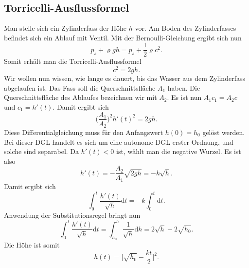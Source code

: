 \documentclass[a4paper,10pt,fleqn,twocolumn,twoside]{scrartcl}
\begin{document}
\subsection{Torricelli-Ausflussformel}
Man stelle sich ein Zylinderfass der Höhe \(h\) vor. Am Boden des Zylinderfasses
befindet sich ein Ablauf mit Ventil. Mit der Bernoulli-Gleichung
ergibt sich nun
\[p_s+\varrho gh = p_s+\frac{1}{2}\varrho c^2.\]
Somit erhält man die Torricelli-Ausflussformel
\[c^2=2gh.\]
Wir wollen nun wissen, wie lange es dauert, bis das Wasser aus dem
Zylinderfass abgelaufen ist. Das Fass soll die Querschnittsfläche \(A_1\)
haben. Die Querschnittsfläche des Ablaufes bezeichnen wir mit \(A_2\).
Es ist nun \(A_1c_1=A_2c\) und \(c_1=h'(t)\). Damit ergibt sich
\[\Big(\frac{A_1}{A_2}\Big)^2 h'(t)^2 = 2gh.\]
Diese Differentialgleichung muss für den Anfangswert \(h(0)=h_0\)
gelöst werden. Bei dieser DGL handelt es sich um eine autonome
DGL erster Ordnung, und solche sind separabel. Da \(h'(t)<0\) ist,
wählt man die negative Wurzel. Es ist also
\[h'(t) = -\frac{A_2}{A_1} \sqrt{2gh}
= -k\sqrt{h}.\]
Damit ergibt sich
\[\int_0^t \frac{h'(t)}{\sqrt{h}} \mathrm dt
= -k\int_0^t \mathrm dt.\]
Anwendung der Substitutionsregel bringt nun
\[\int_0^t \frac{h'(t)}{\sqrt{h}}\mathrm dt
= \int_{h_0}^h \frac{1}{\sqrt{h}}\mathrm dh=2\sqrt{h}-2\sqrt{h_0}.\]
Die Höhe ist somit
\[h(t) = \bigg[\sqrt{h_0}-\frac{kt}{2}\bigg]^2.\]
\end{document}
